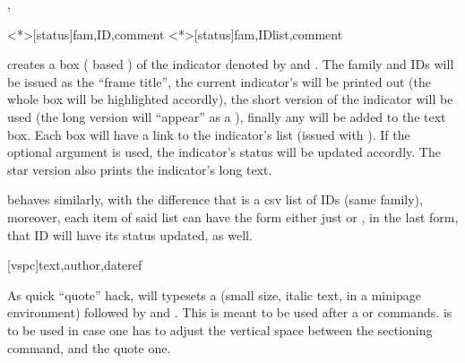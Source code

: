 \documentclass[article,nogeometry,english,tocdepth=3,secdepth=3]{ufrgscca} %
\begin{document}
\begin{codedescribe}{\indref,\indreflst}
	\begin{codesyntax}%
	\tsmacro{\indref}<*>[status]{fam,ID,comment}
	\tsmacro{\indreflst}<*>[status]{fam,IDlist,comment}
\end{codesyntax}
\tsmacro{\indref}{} creates a box ( based  ) of the indicator denoted by   and . The family and IDs will be issued as the “frame title”, the current indicator's  will be printed out (the whole box will be highlighted accordly), the short version of the indicator will be used (the long version will “appear” as a ), finally any  will be added to the text box. Each \tsmacro{\indref}{} box will have a link to the indicator's list (issued with \tsmacro{\PrintIndicators}{}). If the optional argument  is used, the indicator's status will be updated accordly. The star version also prints the indicator's long text.

\tsmacro{\indreflst}{} behaves similarly, with the difference that  is a csv list of IDs (same family), moreover, each item of said list can have the form either just  or , in the last form, that ID will have its status updated, as well.
\end{codedescribe}

\begin{codedescribe}{\fancyquote}
	\begin{codesyntax}%
	\tsmacro{\fancyquote}[vspc]{text,author,dateref}
\end{codesyntax}
As quick “quote” hack, \tsmacro{\fancyquote}{} will typesets a  (small size, italic  text, in a minipage environment) followed by  and . This is meant to be used after a \tsmacro{\chapter}{} or \tsmacro{\section}{} commands.  is to be used in case one has to adjust the vertical space between the sectioning command, and the quote one.
\end{codedescribe}
\end{document}
